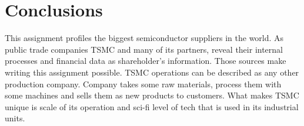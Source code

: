 \documentclass[a4paper,12pt]{article}
\begin{document}

\section{Conclusions}

This assignment profiles the biggest semiconductor suppliers in the world.
As public trade companies TSMC and many of its partners, reveal their internal processes and financial data as shareholder's information.
Those sources make writing this assignment possible.
TSMC operations can be described as any other production company. 
Company takes some raw materials, process them with some machines and sells them as new products to customers. 
What makes TSMC unique is scale of its operation and sci-fi level of tech that is used in its industrial units. 



 
\end{document}

